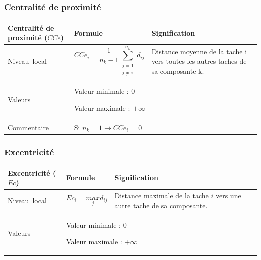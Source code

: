 \documentclass{article}
\begin{document}
\subsubsection{Centralité de proximité}
\label{metric_CCe}
\begin{table}[H]
\raggedright
\begin{tabular}{|m{3.24cm}|m{4.4810004cm}m{7.924cm}|}

\hline
Centralité de proximité ($CCe$) &
\multicolumn{1}{m{4.4810004cm}|}{Formule} &
Signification\\\hline
Niveau~local 

 &
\multicolumn{1}{m{4.4810004cm}|}{\begin{equation*}
{\mathit{CCe}}_{i}=\frac{1}{{n}_{k}-1}\sum _{\begin{matrix}j=1\\j{\neq}i\end{matrix}}^{{n}_{k}}{{d}_{\mathit{ij}}}
\end{equation*}
} &
Distance moyenne de la tache i vers toutes les autres taches de sa composante k. \\\hline
Valeurs &
\multicolumn{2}{m{12.6050005cm}|}{Valeur minimale : 0

Valeur maximale :  $+{\infty}$

}\\\hline
Commentaire &
\multicolumn{2}{m{12.6050005cm}|}{Si  ${n}_{k}=1\rightarrow {\mathit{CCe}}_{i}=0$ }\\\hline
\end{tabular}
\end{table}


\subsubsection{Excentricité}
\label{metric_Ec}
\begin{table}[H]
\raggedright
\begin{tabular}{|m{3.24cm}|m{4.4810004cm}m{7.924cm}|}

\hline
Excentricité ($Ec$) &
\multicolumn{1}{m{4.4810004cm}|}{Formule} &
Signification\\\hline
Niveau~local 

 &
\multicolumn{1}{m{4.4810004cm}|}{\begin{equation*}
{\mathit{Ec}}_{i}=\underset{j}{\mathit{max}}{d}_{\mathit{ij}}
\end{equation*}
} &
Distance maximale de la tache $i$ vers une autre tache de sa composante. \\\hline
Valeurs &
\multicolumn{2}{m{12.6050005cm}|}{Valeur minimale : 0

Valeur maximale :  $+{\infty}$

}\\\hline
\end{tabular}
\end{table}
\end{document}

